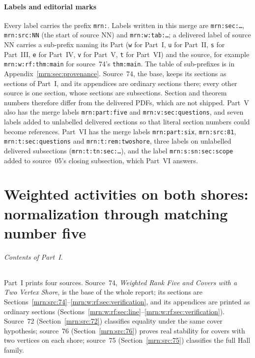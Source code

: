 \documentclass[11pt,a4paper]{article}
\theoremstyle{remark}\newtheorem{remark}[theorem]{Remark}
\begin{document}
\subsection{Labels and editorial marks}\label{mrn:sec:labels}
Every label carries the prefix \texttt{mrn:}. Labels written in this merge
are \texttt{mrn:sec:\dots}, \texttt{mrn:src:NN} (the start of source NN) and
\texttt{mrn:w:tab:\dots}; a delivered label of source NN carries a
sub-prefix naming its Part (\texttt{w} for Part~I, \texttt{u} for Part~II,
\texttt{s} for Part~III, \texttt{e} for Part~IV, \texttt{v} for Part~V,
\texttt{t} for Part~VI) and
the source, for example
\texttt{mrn:w:rf:thm:main} for source~74's \texttt{thm:main}. The table of
sub-prefixes is in Appendix~\ref{mrn:sec:provenance}. Source~74, the base,
keeps its sections as sections of Part~I, and its appendices are ordinary
sections there; every other source is one section, whose sections are
subsections. Section and theorem numbers therefore differ from the
delivered PDFs, which are not shipped. Part~V also has the merge labels
\texttt{mrn:part:five} and \texttt{mrn:v:sec:questions}, and seven labels
added to unlabelled delivered sections so that literal section numbers could
become references.
Part~VI has the merge labels \texttt{mrn:part:six}, \texttt{mrn:src:81},
\texttt{mrn:t:sec:questions} and \texttt{mrn:t:rem:twoshore}, three labels
on unlabelled delivered subsections (\texttt{mrn:t:tn:sec:\dots}), and the
label \texttt{mrn:s:sn:sec:scope} added to source~05's closing subsection,
which Part~VI answers.

\clearpage
\part{Weighted activities on both shores: normalization through matching number five}\label{mrn:part:one}

\paragraph{Contents of Part~I.}
Part~I prints four sources. Source~74, \emph{Weighted Rank Five and Covers
with a Two Vertex Shore}, is the base of the whole report; its sections are
Sections~\ref{mrn:src:74}--\ref{mrn:w:rf:sec:verification}, and its
appendices are printed as ordinary sections
(Sections~\ref{mrn:w:rf:sec:line}--\ref{mrn:w:rf:sec:verification}).
Source~72 (Section~\ref{mrn:src:72}) classifies equality under the same
cover hypothesis; source~76 (Section~\ref{mrn:src:76}) proves real stability
for covers with two vertices on each shore; source~75
(Section~\ref{mrn:src:75}) classifies the full Hall family.
\end{document}
